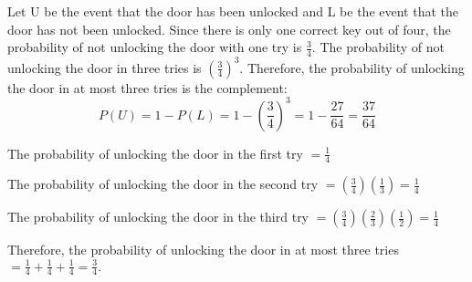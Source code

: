 \begin{solution}
    Let U be the event that the door has been unlocked and L be the event that the door has not been unlocked. Since there is only one correct key out of four, the probability of not unlocking the door with one try is \( \frac{3}{4} \). The probability of not unlocking the door in three tries is \( \left(\frac{3}{4}\right)^3 \). Therefore, the probability of unlocking the door in at most three tries is the complement:
    \[ P(U) = 1 - P(L) = 1 - \left(\frac{3}{4}\right)^3 = 1 - \frac{27}{64} = \frac{37}{64} \]


    \begin{center}
    \end{center}
    The probability of unlocking the door in the first try \( = \frac{1}{4} \)

    The probability of unlocking the door in the second try \( = \left(\frac{3}{4}\right)\left(\frac{1}{3}\right) = \frac{1}{4} \)

    The probability of unlocking the door in the third try \( = \left(\frac{3}{4}\right)\left(\frac{2}{3}\right)\left(\frac{1}{2}\right) = \frac{1}{4} \)

    Therefore, the probability of unlocking the door in at most three tries \( = \frac{1}{4} + \frac{1}{4} + \frac{1}{4} = \frac{3}{4}. \)

\end{solution}

